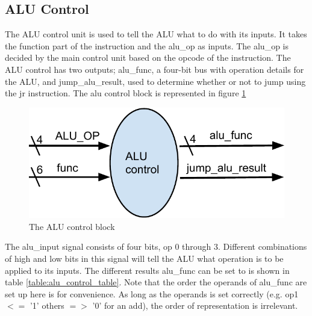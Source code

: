 \subsection{ALU Control}

The ALU control unit is used to tell the ALU what to do with its inputs. It takes the function part of the instruction and the alu\_op as inputs. The alu\_op is decided by the main control unit based on the opcode of the instruction. The ALU control has two outputs; alu\_func, a four-bit bus with operation details for the ALU, and jump\_alu\_result, used to determine whether or not to jump using the jr instruction. The alu control block is represented in figure \ref {fig:alu_control}
\begin{figure}
	\label{fig:alu_control}
	\includegraphics{figures/alu_control}
	\caption{The ALU control block}
\end{figure}

The alu\_input signal consists of four bits, op 0 through 3. Different combinations of high and low bits in this signal will tell the ALU what operation is to be applied to its inputs.  The different results alu\_func can be set to is shown in table \ref{table:alu_control_table}. Note that the order the operands of alu\_func are set up here is for convenience. As long as the operands is set correctly (e.g. op1 $<=$ '1' others $=>$ '0' for an add), the order of representation is irrelevant. 

